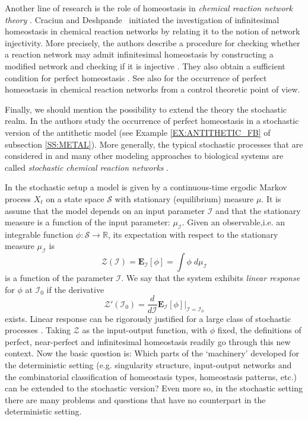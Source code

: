 \documentclass[a4paper,fleqn]{cas-dc}
\newcommand{\II}{{\mathcal I}}
\begin{document}
Another line of research is the role of homeostasis in \emph{chemical reaction network theory} \cite{feinberg2019,craciun2018}. 
Craciun and Deshpande~\cite{craciun2022} initiated the investigation of infinitesimal homeostasis in chemical reaction networks by relating it to the notion of network injectivity.
More precisely, the authors describe a procedure for checking whether a reaction network may admit infinitesimal homeostasis by constructing a modified network and checking if it is injective \cite[Thm. 3.4]{craciun2022}.
They also obtain a sufficient condition for perfect homeostasis \cite[Thm. 3.5]{craciun2022}. 
See also \cite{araujo2023} for the occurrence of perfect homeostasis in chemical reaction networks from a control theoretic point of view.

Finally, we should mention the possibility to extend the theory the stochastic realm.
In \cite{briat2016,aoki2019} the authors study the occurrence of perfect homeostasis in a stochastic version of the antithetic model (see Example \ref{EX:ANTITHETIC_FB} of subsection \ref{SS:METAL}).
More generally, the typical stochastic processes that are considered in \cite{briat2016,aoki2019} and many other modeling approaches to biological systems are called \emph{stochastic chemical reaction networks} \cite{anderson2015}.

In the stochastic setup a model is given by a continuous-time ergodic Markov process $X_t$ on a state space $\mathcal{S}$ with stationary (equilibrium) measure $\mu$.
It is assume that the model depends on an input parameter $\II$ and that the stationary measure is a function of the input parameter: $\mu_{\II}$.
Given an observable,i.e. an integrable function $\phi:\mathcal{S} \to \mathbb{R}$, its expectation with respect to the stationary measure $\mu_{\II}$ is
\[
 \mathcal{Z}(\II) = \mathbf{E}_{\mathcal{I}}[\phi] = \int \phi \; d\mu_\mathcal{I}
\]
is a function of the parameter $\mathcal{I}$. 
We say that the system exhibits \emph{linear response} for $\phi$ at $\mathcal{I}_0$ if the derivative
\[
 \mathcal{Z}'(\II_0) = \frac{d}{d\mathcal{I}} \mathbf{E}_{\mathcal{I}}[\phi] \bigg|_{\mathcal{I}=\mathcal{I}_0}
\]
exists.
Linear response can be rigorously justified for a large class of stochastic processes \cite{hairer2010,mackay2011}.
Taking $\mathcal{Z}$ as the input-output function, with $\phi$ fixed, the definitions of perfect, near-perfect and infinitesimal homeostasis readily go through this new context.
Now the basic question is: Which parts of the `machinery' developed for the deterministic setting (e.g. singularity structure, input-output networks and the combinatorial classification of homeostasis types, homeostasis patterns, etc.) can be extended to the stochastic version?
Even more so, in the stochastic setting there are many problems and questions that have no counterpart in the deterministic setting.
\end{document}
